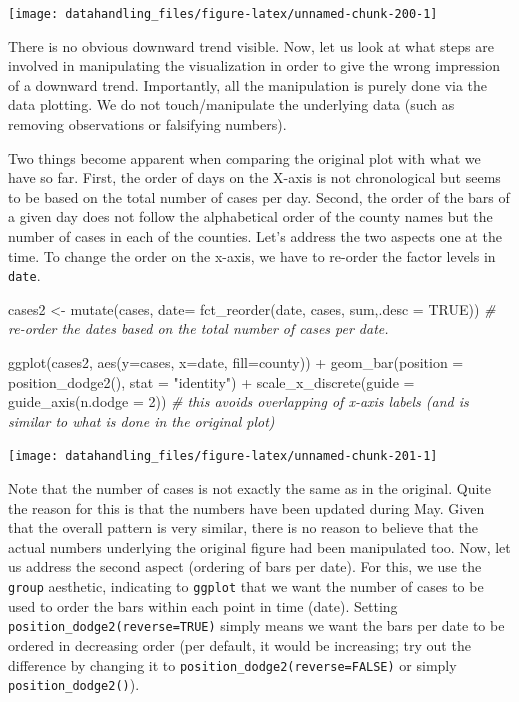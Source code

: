 \documentclass[
  12pt,
]{style/krantz}
\newenvironment{Shaded}{\begin{snugshade}}{\end{snugshade}}
\newcommand{\AttributeTok}[1]{\textcolor[rgb]{0.77,0.63,0.00}{#1}}
\newcommand{\CommentTok}[1]{\textcolor[rgb]{0.56,0.35,0.01}{\textit{#1}}}
\newcommand{\ConstantTok}[1]{\textcolor[rgb]{0.00,0.00,0.00}{#1}}
\newcommand{\DecValTok}[1]{\textcolor[rgb]{0.00,0.00,0.81}{#1}}
\newcommand{\FunctionTok}[1]{\textcolor[rgb]{0.00,0.00,0.00}{#1}}
\newcommand{\NormalTok}[1]{#1}
\newcommand{\OtherTok}[1]{\textcolor[rgb]{0.56,0.35,0.01}{#1}}
\newcommand{\SpecialCharTok}[1]{\textcolor[rgb]{0.00,0.00,0.00}{#1}}
\newcommand{\StringTok}[1]{\textcolor[rgb]{0.31,0.60,0.02}{#1}}
\begin{document}
\texttt{[image: datahandling\_files/figure-latex/unnamed-chunk-200-1]}

There is no obvious downward trend visible. Now, let us look at what steps are involved in manipulating the visualization in order to give the wrong impression of a downward trend. Importantly, all the manipulation is purely done via the data plotting. We do not touch/manipulate the underlying data (such as removing observations or falsifying numbers).

Two things become apparent when comparing the original plot with what we have so far. First, the order of days on the X-axis is not chronological but seems to be based on the total number of cases per day. Second, the order of the bars of a given day does not follow the alphabetical order of the county names but the number of cases in each of the counties. Let's address the two aspects one at the time. To change the order on the x-axis, we have to re-order the factor levels in \texttt{date}.

\begin{Shaded}
\begin{Highlighting}[]
\NormalTok{cases2 }\OtherTok{\textless{}{-}} \FunctionTok{mutate}\NormalTok{(cases, }\AttributeTok{date=} \FunctionTok{fct\_reorder}\NormalTok{(date, cases, sum,}\AttributeTok{.desc =} \ConstantTok{TRUE}\NormalTok{)) }\CommentTok{\# re{-}order the dates based on the total number of cases per date.}

\FunctionTok{ggplot}\NormalTok{(cases2, }\FunctionTok{aes}\NormalTok{(}\AttributeTok{y=}\NormalTok{cases, }\AttributeTok{x=}\NormalTok{date, }\AttributeTok{fill=}\NormalTok{county)) }\SpecialCharTok{+}
  \FunctionTok{geom\_bar}\NormalTok{(}\AttributeTok{position =} \FunctionTok{position\_dodge2}\NormalTok{(), }\AttributeTok{stat =} \StringTok{"identity"}\NormalTok{) }\SpecialCharTok{+}
  \FunctionTok{scale\_x\_discrete}\NormalTok{(}\AttributeTok{guide =} \FunctionTok{guide\_axis}\NormalTok{(}\AttributeTok{n.dodge =} \DecValTok{2}\NormalTok{))  }\CommentTok{\# this avoids overlapping of x{-}axis labels (and is similar to what is done in the original plot)}
\end{Highlighting}
\end{Shaded}

\texttt{[image: datahandling\_files/figure-latex/unnamed-chunk-201-1]}

Note that the number of cases is not exactly the same as in the original. Quite the reason for this is that the numbers have been updated during May. Given that the overall pattern is very similar, there is no reason to believe that the actual numbers underlying the original figure had been manipulated too. Now, let us address the second aspect (ordering of bars per date). For this, we use the \texttt{group} aesthetic, indicating to \texttt{ggplot} that we want the number of cases to be used to order the bars within each point in time (date). Setting \texttt{position\_dodge2(reverse=TRUE)} simply means we want the bars per date to be ordered in decreasing order (per default, it would be increasing; try out the difference by changing it to \texttt{position\_dodge2(reverse=FALSE)} or simply \texttt{position\_dodge2()}).
\end{document}
